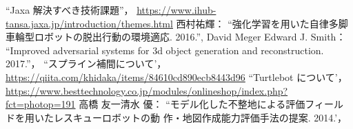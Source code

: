 \documentclass[uplatex,twocolumn, dvipdfmx]{jsarticle}  %
\begin{document}
\small
\begin{thebibliography}{9}

``Jaxa 解決すべき技術課題''，
  \url{https://www.ihub-tansa.jaxa.jp/introduction/themes.html}
西村祐輝：
  ``強化学習を用いた自律多脚車輪型ロボットの脱出行動の環境適応. 2016.'',
David Meger Edward J. Smith：
  ``Improved adversarial systems for 3d object generation and
  reconstruction. 2017.''，
  ``スプライン補間について'，
  \url{https://qiita.com/khidaka/items/84610cd890ecb8443d96}
  ``Turtlebot について'，
  \url{https://www.besttechnology.co.jp/modules/onlineshop/index.php?fct=photop=191}
  高橋 友一清水 優：
  ``モデル化した不整地による評価フィールドを用いたレスキューロボットの動
  作・地図作成能力評価手法の提案. 2014.'，
\end{thebibliography}
\end{document}
